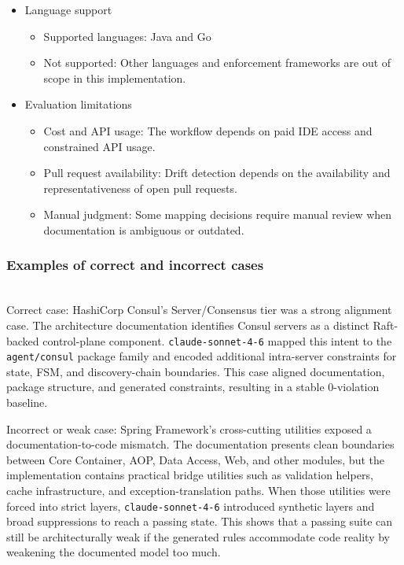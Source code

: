 \documentclass[sigconf,screen]{acmart}
\begin{document}
\begin{itemize}
\begin{itemize}
        \item Documentation dependency: The approach assumes the availability of ArchAgent benchmark ground truth documentation for each target repository.
    \end{itemize}
    \item Language support
    \begin{itemize}
        \item Supported languages: Java and Go
        \item Not supported: Other languages and enforcement frameworks are out of scope in this implementation.
    \end{itemize}
    \item Evaluation limitations
    \begin{itemize}
        \item Cost and API usage: The workflow depends on paid IDE access and constrained API usage.
        \item Pull request availability: Drift detection depends on the availability and representativeness of open pull requests.
        \item Manual judgment: Some mapping decisions require manual review when documentation is ambiguous or outdated.
    \end{itemize}
\end{itemize}

\subsubsection{Examples of correct and incorrect cases}\mbox{}\\\hspace*{\parindent}
Correct case: HashiCorp Consul's Server/Consensus tier was a strong alignment case. The architecture documentation identifies Consul servers as a distinct Raft-backed control-plane component. \texttt{claude-sonnet-4-6} mapped this intent to the \texttt{agent/consul} package family and encoded additional intra-server constraints for state, FSM, and discovery-chain boundaries. This case aligned documentation, package structure, and generated constraints, resulting in a stable 0-violation baseline.

Incorrect or weak case: Spring Framework's cross-cutting utilities exposed a documentation-to-code mismatch. The documentation presents clean boundaries between Core Container, AOP, Data Access, Web, and other modules, but the implementation contains practical bridge utilities such as validation helpers, cache infrastructure, and exception-translation paths. When those utilities were forced into strict layers, \texttt{claude-sonnet-4-6} introduced synthetic layers and broad suppressions to reach a passing state. This shows that a passing suite can still be architecturally weak if the generated rules accommodate code reality by weakening the documented model too much.
\end{document}
